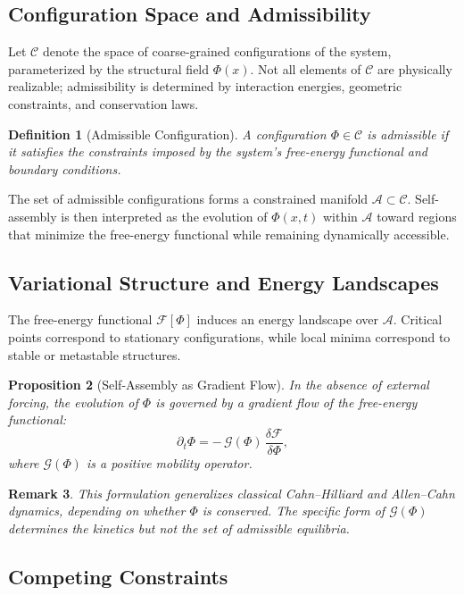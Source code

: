\documentclass[11pt, a4paper, twocolumn]{article}
\newtheorem{definition}{Definition}[section]
\newtheorem{proposition}[definition]{Proposition}
\newtheorem{remark}[definition]{Remark}
\newcommand{\F}{\mathcal{F}}
\begin{document}
\subsection{Configuration Space and Admissibility}

Let $\mathcal{C}$ denote the space of coarse-grained configurations of the
system, parameterized by the structural field $\Phi(x)$. Not all elements of
$\mathcal{C}$ are physically realizable; admissibility is determined by
interaction energies, geometric constraints, and conservation laws.

\begin{definition}[Admissible Configuration]
A configuration $\Phi \in \mathcal{C}$ is admissible if it satisfies the
constraints imposed by the system's free-energy functional and boundary
conditions.
\end{definition}

The set of admissible configurations forms a constrained manifold
$\mathcal{A} \subset \mathcal{C}$. Self-assembly is then interpreted as the
evolution of $\Phi(x,t)$ within $\mathcal{A}$ toward regions that minimize
the free-energy functional while remaining dynamically accessible.

\subsection{Variational Structure and Energy Landscapes}

The free-energy functional $\F[\Phi]$ induces an energy landscape over
$\mathcal{A}$. Critical points correspond to stationary configurations, while
local minima correspond to stable or metastable structures.

\begin{proposition}[Self-Assembly as Gradient Flow]
In the absence of external forcing, the evolution of $\Phi$ is governed by a
gradient flow of the free-energy functional:
\[
    \partial_t \Phi = -\,\mathcal{G}(\Phi)\,\frac{\delta \F}{\delta \Phi},
\]
where $\mathcal{G}(\Phi)$ is a positive mobility operator.
\end{proposition}

\begin{remark}
This formulation generalizes classical Cahn--Hilliard and Allen--Cahn dynamics,
depending on whether $\Phi$ is conserved. The specific form of
$\mathcal{G}(\Phi)$ determines the kinetics but not the set of admissible
equilibria.
\end{remark}

\subsection{Competing Constraints}
\end{document}
